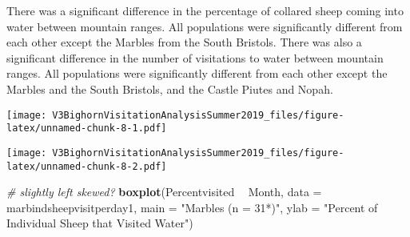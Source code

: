\documentclass[]{article}
\newenvironment{Shaded}{\begin{snugshade}}{\end{snugshade}}
\newcommand{\CommentTok}[1]{\textcolor[rgb]{0.56,0.35,0.01}{\textit{#1}}}
\newcommand{\DataTypeTok}[1]{\textcolor[rgb]{0.13,0.29,0.53}{#1}}
\newcommand{\KeywordTok}[1]{\textcolor[rgb]{0.13,0.29,0.53}{\textbf{#1}}}
\newcommand{\NormalTok}[1]{#1}
\newcommand{\OperatorTok}[1]{\textcolor[rgb]{0.81,0.36,0.00}{\textbf{#1}}}
\newcommand{\StringTok}[1]{\textcolor[rgb]{0.31,0.60,0.02}{#1}}
\begin{document}
There was a significant difference in the percentage of collared sheep
coming into water between mountain ranges. All populations were
significantly different from each other except the Marbles from the
South Bristols. There was also a significant difference in the number of
visitations to water between mountain ranges. All populations were
significantly different from each other except the Marbles and the South
Bristols, and the Castle Piutes and Nopah.

\begin{Shaded}
\end{Shaded}

\texttt{[image: V3BighornVisitationAnalysisSummer2019\_files/figure-latex/unnamed-chunk-8-1.pdf]}

\begin{Shaded}
\end{Shaded}

\texttt{[image: V3BighornVisitationAnalysisSummer2019\_files/figure-latex/unnamed-chunk-8-2.pdf]}

\begin{Shaded}
\begin{Highlighting}[]
\CommentTok{# slightly left skewed?}
\KeywordTok{boxplot}\NormalTok{(Percentvisited }\OperatorTok{~}\StringTok{ }\NormalTok{Month, }\DataTypeTok{data =}\NormalTok{ marbindsheepvisitperday1, }\DataTypeTok{main =} \StringTok{"Marbles (n = 31*)"}\NormalTok{, }\DataTypeTok{ylab =} \StringTok{"Percent of Individual Sheep that Visited Water"}\NormalTok{)}
\end{Highlighting}
\end{Shaded}
\end{document}
